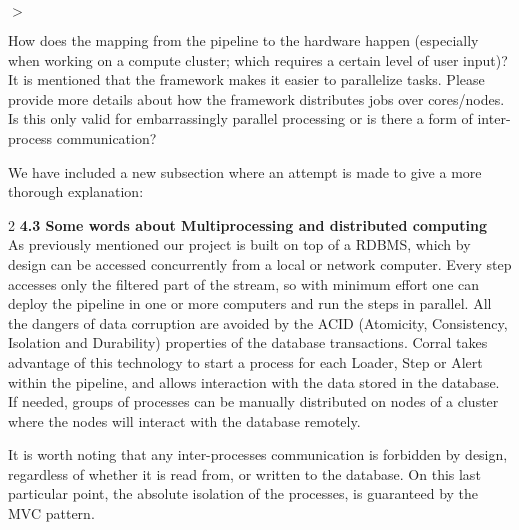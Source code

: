 \documentclass[a4paper,onecolumn,fleqn,usenatbib,useAMS]{mnrasr}
\newenvironment{frshaded}{%
\def\FrameCommand{\fboxrule=\FrameRule\fboxsep=\FrameSep \fcolorbox{framecolor}{shadecolor}}%
\MakeFramed {\FrameRestore}}%
{\endMakeFramed}
\newenvironment{myindentpar}[1]%
 {\begin{list}{}%
         \bigskip
         \color{refereecolor}
         {\setlength{\leftmargin}{#1}}%
         \itshape
         \item[$>$]%
 }
 {\end{list}}
\begin{document}
%
\begin{myindentpar}{1cm}
How does the mapping from the pipeline to the hardware happen
(especially when working on a compute cluster; which requires a
certain level of user input)? \\

It is mentioned that the framework makes it easier to parallelize
tasks. Please provide more details about how the framework distributes
jobs over cores/nodes. \\


Is this only valid for embarrassingly parallel processing or is
there a form of inter-process communication?
\end{myindentpar}

%
We have included a new subsection 
where an attempt is made to give a more thorough explanation:

\begin{frshaded}
\begin{multicols}{2}
 \textbf{4.3 Some words about Multiprocessing and distributed computing}\\

As previously mentioned our project is built on top of a RDBMS, which by design 
can be accessed concurrently from a local or network computer. 
%
Every step accesses only the filtered part of the stream, 
so with minimum effort one can deploy the pipeline in one or more
computers and run the steps in parallel. 
%
All the dangers of data corruption are avoided
by the ACID (Atomicity, Consistency, Isolation and Durability) 
properties of the database transactions.
%
Corral takes advantage of this technology to start a process for each Loader,
Step or Alert within the pipeline, and allows interaction with the data 
stored in the database.
%
If needed, groups of processes can be manually distributed on nodes of a
cluster where the nodes will interact with the database remotely.

It is worth noting that any inter-processes communication is forbidden by design,
regardless of whether it is read from, or written to the database.
%
On this last particular point, the absolute isolation of the processes,
is guaranteed by the MVC pattern.
\end{multicols}\end{frshaded}
               
\end{document}
